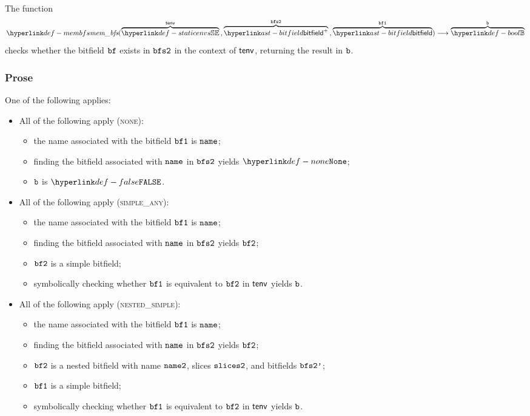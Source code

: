 \hypertarget{def-membfs}{}
The function
\[
  \membfs(\overname{\staticenvs}{\tenv} \aslsep \overname{\bitfield^+}{\bfstwo} \aslsep \overname{\bitfield}{\vbfone})
  \aslto \overname{\Bool}{\vb}
\]
checks whether the bitfield $\texttt{bf}$ exists in $\texttt{bfs2}$ in the context of $\textsf{tenv}$, returning the result in $\texttt{b}$.

\subsubsection{Prose}
One of the following applies:
\begin{itemize}
  \item All of the following apply (\textsc{none}):
  \begin{itemize}
    \item the name associated with the bitfield $\texttt{bf1}$ is $\texttt{name}$;
    \item finding the bitfield associated with $\texttt{name}$ in $\texttt{bfs2}$ yields $\None$;
    \item $\texttt{b}$ is $\False$.
  \end{itemize}

  \item All of the following apply (\textsc{simple\_any}):
  \begin{itemize}
    \item the name associated with the bitfield $\texttt{bf1}$ is $\texttt{name}$;
    \item finding the bitfield associated with $\texttt{name}$ in $\texttt{bfs2}$ yields $\texttt{bf2}$;
    \item $\texttt{bf2}$ is a simple bitfield;
    \item symbolically checking whether $\texttt{bf1}$ is equivalent to $\texttt{bf2}$ in $\textsf{tenv}$ yields $\texttt{b}$.
  \end{itemize}

  \item All of the following apply (\textsc{nested\_simple}):
  \begin{itemize}
    \item the name associated with the bitfield $\texttt{bf1}$ is $\texttt{name}$;
    \item finding the bitfield associated with $\texttt{name}$ in $\texttt{bfs2}$ yields $\texttt{bf2}$;
    \item $\texttt{bf2}$ is a nested bitfield with name $\texttt{name2}$, slices $\texttt{slices2}$, and bitfields $\texttt{bfs2'}$;
    \item $\texttt{bf1}$ is a simple bitfield;
    \item symbolically checking whether $\texttt{bf1}$ is equivalent to $\texttt{bf2}$ in $\textsf{tenv}$ yields $\texttt{b}$.
  \end{itemize}


\end{itemize}
